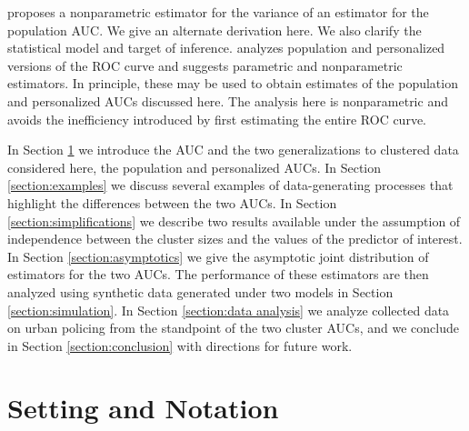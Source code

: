 \documentclass[12pt]{article}
\newcommand{\comment}[1]{
  \iftoggle{commenttoggle}{
    {\normalsize{\color{red}{ #1}}\normalsize}
  }
  {}
}
\begin{document}
\citet{obuchowski1997} proposes a nonparametric estimator for the
variance of an estimator for the population AUC. We give an alternate
derivation here. We also clarify the statistical model and target of
inference. \citet{michael2019} analyzes population and personalized
versions of the ROC curve and suggests parametric and nonparametric
estimators. In principle, these may be used to obtain estimates of the
population and personalized AUCs discussed here. The analysis here is
nonparametric and avoids the inefficiency introduced by first estimating the entire ROC curve.%

In Section \ref{section:setting} we introduce the AUC
and the two generalizations to clustered data considered here, the
population and personalized AUCs. In Section \ref{section:examples} we
discuss several examples of data-generating processes that highlight
the differences between the two AUCs. In Section
\ref{section:simplifications} we describe two results available under
the assumption of independence between the cluster sizes and the
values of the predictor of interest. In Section \ref{section:asymptotics} we
give the asymptotic joint distribution of estimators for the two AUCs. The performance of these estimators are then
analyzed using synthetic data generated under two models in Section
\ref{section:simulation}. In Section \ref{section:data analysis} we
analyze collected data on urban policing from the standpoint of the
two cluster AUCs, and we conclude in Section \ref{section:conclusion}
with directions for future work.


\section{Setting and Notation}\label{section:setting}
\end{document}

